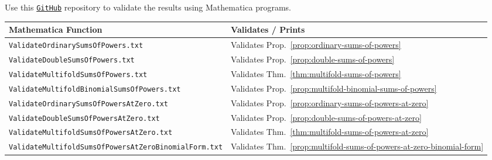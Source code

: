 Use this
\href{https://github.com/kolosovpetro/SumsOfPowersViaCentralFiniteDifferencesAndNewtonFormula/tree/main/mathematica}
{\texttt{GitHub}}
repository to validate the results using Mathematica programs.
\\
\begin{center}
  \renewcommand{\arraystretch}{1.3}
  \begin{tabular}{ll}
    \toprule
    \textbf{Mathematica Function}  & \textbf{Validates / Prints} \\
    \midrule
    \texttt{ValidateOrdinarySumsOfPowers.txt}
    & Validates Prop.~\eqref{prop:ordinary-sums-of-powers}
    \\
    \texttt{ValidateDoubleSumsOfPowers.txt}
    & Validates Prop.~\eqref{prop:double-sums-of-powers}
    \\
    \texttt{ValidateMultifoldSumsOfPowers.txt}
    & Validates Thm.~\eqref{thm:multifold-sums-of-powers}
    \\
    \texttt{ValidateMultifoldBinomialSumsOfPowers.txt}
    & Validates Prop.~\eqref{prop:multifold-binomial-sums-of-powers}
    \\
    \texttt{ValidateOrdinarySumsOfPowersAtZero.txt}
    & Validates Prop.~\eqref{prop:ordinary-sums-of-powers-at-zero}
    \\
    \texttt{ValidateDoubleSumsOfPowersAtZero.txt}
    & Validates Prop.~\eqref{prop:double-sums-of-powers-at-zero}
    \\
    \texttt{ValidateMultifoldSumsOfPowersAtZero.txt}
    & Validates Thm.~\eqref{thm:multifold-sums-of-powers-at-zero}
    \\
    \texttt{ValidateMultifoldSumsOfPowersAtZeroBinomialForm.txt}
    & Validates Thm.~\eqref{prop:multifold-sums-of-powers-at-zero-binomial-form}
    \\
    \bottomrule
  \end{tabular}
\end{center}
